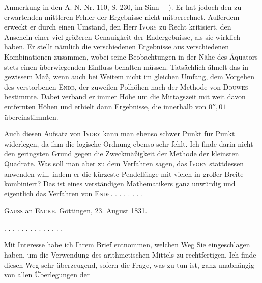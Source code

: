 Anmerkung in den A. N. Nr. 110, S. 230, im Sinn —). Er hat jedoch den zu erwartenden mittleren Fehler der Ergebnisse nicht mitberechnet. Außerdem erweckt er durch einen Umstand, den Herr \textsc{Ivory} zu Recht kritisiert, den Anschein einer viel größeren Genauigkeit der Endergebnisse, als sie wirklich haben. Er stellt nämlich die verschiedenen Ergebnisse aus verschiedenen Kombinationen zusammen, wobei seine Beobachtungen in der Nähe des Äquators stets einen überwiegenden Einfluss behalten müssen. Tatsächlich ähnelt das in gewissem Maß, wenn auch bei Weitem nicht im gleichen Umfang, dem Vorgehen des verstorbenen \textsc{Ende}, der zuweilen Polhöhen nach der Methode von \textsc{Douwes} bestimmte. Dabei verband er immer  Höhe um die Mittagszeit mit  weit davon entfernten Höhen und erhielt dann Ergebnisse, die innerhalb von $0'',01$ übereinstimmten.

Auch diesen Aufsatz von \textsc{Ivory} kann man ebenso schwer Punkt für Punkt widerlegen, da ihm die logische Ordnung ebenso sehr fehlt. Ich finde darin nicht den geringsten Grund gegen die Zweckmäßigkeit der Methode der kleinsten Quadrate. Was soll man aber zu dem Verfahren sagen, das \textsc{Ivory} stattdessen anwenden will, indem er die kürzeste Pendellänge mit vielen in großer Breite kombiniert? Das ist eines verständigen Mathematikers ganz unwürdig und eigentlich das Verfahren von \textsc{Ende}. . . . . . . .

\begin{center}\textsc{Gauss} an \textsc{Encke}. Göttingen, 23. August 1831.\end{center}

. . . . . . . . . . . . . .

Mit Interesse habe ich Ihrem Brief entnommen, welchen Weg Sie eingeschlagen haben, um die Verwendung des arithmetischen Mittels zu rechtfertigen. Ich finde diesen Weg sehr überzeugend, sofern die Frage, was zu tun ist, ganz unabhängig von allen Überlegungen der\space%

